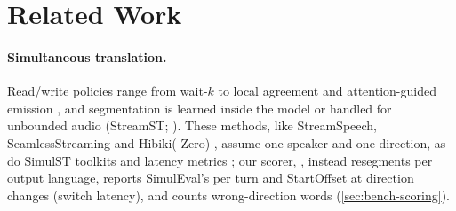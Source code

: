 \section{Related Work}
\label{sec:related}



\paragraph{Simultaneous translation.}
Read/write policies range from wait-$k$ to local agreement and attention-guided emission \citep{ma2019stacl,liu2020lowlatency,papi2023alignatt}, and segmentation is learned inside the model \citep{zhang2023endtoend} or handled for unbounded audio (StreamST; \citealp{papi2024streamatt}).
These methods, like StreamSpeech, SeamlessStreaming and Hibiki(-Zero) \citep{zhang2024streamspeech,seamless2023seamless,labiausse2025highfidelity,labiausse2026simultaneous}, assume one speaker and one direction, as do SimulST toolkits and latency metrics \citep{ma2020simuleval,gaido2025simulstream,polak2025better}; our scorer, \scorer, instead resegments per output language, reports SimulEval's \eo per turn and StartOffset at direction changes (switch latency), and counts wrong-direction words (\cref{sec:bench-scoring}).

